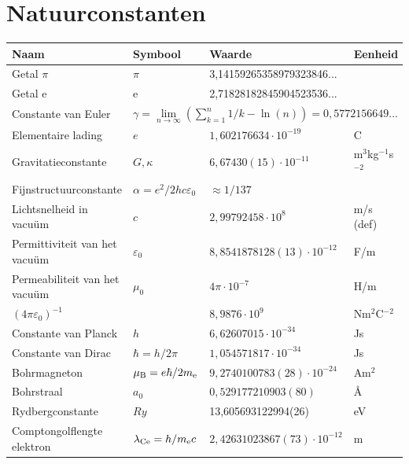 \documentclass[twoside]{report}
\begin{document}
\tableofcontents
\newpage


\chapter*{\center Natuurconstanten}
\begin{center}
\begin{tabular}{||l|lll||}
\hline
{\bf Naam}&{\bf Symbool}&{\bf Waarde}&{\bf Eenheid}\\
\hline
\hline
Getal $\pi$                    &$\pi$&3,14159265358979323846...&\\
Getal e                        &e    &2,71828182845904523536...&\\
Constante van Euler&\multicolumn{3}{|l||}{$\gamma=\lim\limits_{n\rightarrow\infty}\left(\sum\limits_{k=1}^n 1/k-\ln(n)\right)=0,5772156649...$}\\
\hline
Elementaire lading             &$e$&$1,602176634\cdot10^{-19}$&C\rule{0pt}{13pt}\\
Gravitatieconstante            &$G,\kappa$&$6,67430(15)\cdot10^{-11}$&m$^3$kg$^{-1}$s$^{-2}$\\
Fijnstructuurconstante         &$\alpha=e^2/2hc\varepsilon_0$&$\approx1/137$&\\
Lichtsnelheid in vacu\"um      &$c$&$2,99792458\cdot10^8$&m/s (def)\\
Permittiviteit van het vacu\"um&$\varepsilon_0$&$8,8541878128(13)\cdot10^{-12}$&F/m\\
Permeabiliteit van het vacu\"um&$\mu_0$&$4\pi\cdot10^{-7}$&H/m\\
$(4\pi\varepsilon_0)^{-1}$     &&$8,9876\cdot10^9$&Nm$^2$C$^{-2}$\\
\hline
Constante van Planck           &$h$&$6,62607015\cdot10^{-34}$&Js\rule{0pt}{13pt}\\
Constante van Dirac            &$\hbar=h/2\pi$&$1,054571817\cdot10^{-34}$&Js\\
Bohrmagneton                   &$\mu_{\rm B}=e\hbar/2m_{\rm e}$&$9,2740100783(28)\cdot10^{-24}$&Am$^2$\\
Bohrstraal                     &$a_0$&$0,529177210903(80)$&\AA\\
Rydbergconstante               &$Ry$&13,605693122994(26)&eV\\
Comptongolflengte elektron     &$\lambda_{\rm Ce}=h/m_{\rm e} c$&$2,42631023867(73)\cdot10^{-12}$&m\\

\end{tabular}
\end{center}
\end{document}
